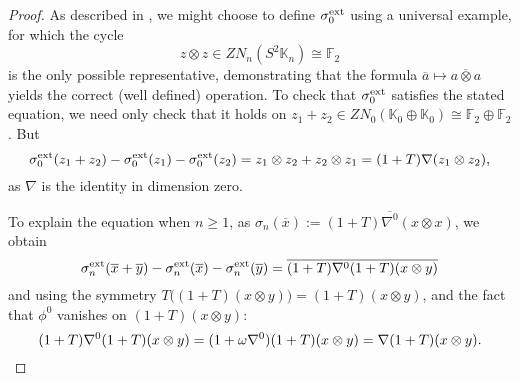 \documentclass[11pt]{amsart}
\theoremstyle{plain}
\theoremstyle{definition}
\let\oldphi\phi
\let\phi\varphi
\theoremstyle{plain}
\newcommand{\Nabla}{\nabla}
\newcommand{\F}{\mathbb{F}}
\begin{document}
\begin{Constructing (co)homotopy operations}
\begin{proof}
As described in \cite[\S3]{MR1089001}, we might choose to define $\sigma^\textup{ext}_0$ using a universal example, for which the cycle 
\[z\otimes z\in ZN_n(S^2\mathbb{K}_n)\cong \F_2\]
is the only possible representative, demonstrating that the formula $\overline{a}\mapsto \overline{a\otimes a}$ yields the correct (well defined) operation. To check that $\sigma_0^\textup{ext}$ satisfies the stated equation, we need only check that it holds on $z_1+z_2\in ZN_0(\mathbb{K}_0\oplus \mathbb{K}_0)\cong \F_2\oplus \F_2$. But
\[\sigma_0^\textup{ext}(z_1+z_2)-\sigma_0^\textup{ext}(z_1)-\sigma_0^\textup{ext}(z_2)=z_1\otimes z_2+z_2\otimes z_1=(1+T)\Nabla(z_1\otimes z_2),\]
as $\Nabla$ is the identity in dimension zero.

To explain the equation when $n\geq1$, as $\sigma_n(\overline{x}):=\overline{(1+T)\Nabla^0(x\otimes x)}$, we obtain %
\[\sigma_n^\textup{ext}(\overline{x}+\overline{y})-\sigma_n^\textup{ext}(\overline{x})-\sigma_n^\textup{ext}(\overline{y})
=
\overline{(1+T)\Nabla^0(1+T)(x\otimes y)}\]
and using the symmetry  $T\bigl((1+T)(x\otimes y)\bigr)=(1+T)(x\otimes y)$, and the fact that $\oldphi^0$ vanishes on $(1+T)(x\otimes y)$:
\[
(1+T)\Nabla^0(1+T)(x\otimes y)
=
(1+\omega\Nabla^0)(1+T)(x\otimes y)
=
\Nabla(1+T)(x\otimes y).\qedhere
\]
\end{proof}


\end{Constructing (co)homotopy operations}
\end{document}
